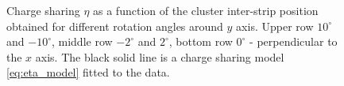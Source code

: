 \begin{figure}[tbph]
\begin{center}
\caption{Charge sharing $\eta$ as a function of the cluster inter-strip position obtained for different rotation angles around $y$ axis. Upper row $10^{\circ}$ and $-10^{\circ}$, middle row $-2^{\circ}$ and $2^{\circ}$, bottom row $0^{\circ}$ - perpendicular to the $x$ axis. The black solid line is a charge sharing model \ref{eq:eta_model} fitted to the data. }
\label{fig:eta_fit}
 \end{center}
 \end{figure}